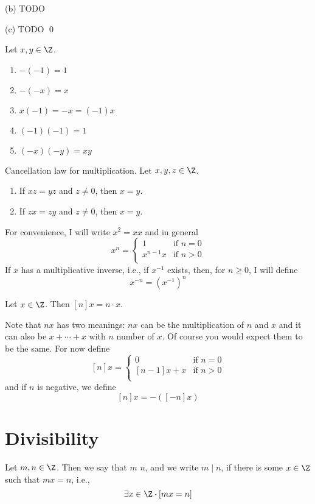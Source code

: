 (b) TODO

(c) TODO
\qed

\begin{prop}
  Let $x, y \in \Z$.
  \begin{enumerate}[nosep,label=\textnormal{(\alph*)}]
  \item $-(-1) = 1$
  \item $-(-x) = x$
  \item $x(-1) = -x = (-1)x$
  \item $(-1)(-1) = 1$
  \item $(-x)(-y) = xy$
  \end{enumerate}
\end{prop}

\begin{prop}
  Cancellation law for multiplication.
  Let $x, y, z \in \Z$.
  \begin{enumerate}[nosep,label=\textnormal{(\alph*)}]
    \item If $xz = yz$ and $z \neq 0$, then $x = y$.
    \item If $zx = zy$ and $z \neq 0$, then $x = y$.
  \end{enumerate}
\end{prop}

For convenience, I will write $x^2 = xx$ and in general
\[
x^n =
\begin{cases}
  1       &\text{if } n = 0 \\
  x^{n-1}x &\text{if } n > 0 \\
\end{cases}
\]
If $x$ has a multiplicative inverse, i.e., if $x^{-1}$ exists,
then, for $n \geq 0$, I will define
\[
x^{-n} = \left( x^{-1} \right)^n
\]

\begin{prop}
  Let $x \in \Z$.
  Then $[n]x = n \cdot x$.
\end{prop}

Note that $nx$ has two meanings: $nx$ can be the multiplication of $n$
and $x$ and it can also be $x + \cdots + x$ with $n$ number of $x$.
Of course you would expect them to be the same.
For now define
\[
  [n]x =
  \begin{cases}
    0       &\text{if } n = 0 \\
    [n-1]x + x &\text{if } n > 0 \\
  \end{cases}
\]
and if $n$ is negative, we define
\[
[n]x = -([-n]x)
\]

\newpage
\section{Divisibility}
\begin{defn}
  Let $m, n \in \Z$.
  Then we say that $m$  $n$, and we write $m \mid n$, if
  there is some $x \in \Z$ such that $mx = n$, i.e.,
  \[
    \exists x \in \Z \cdot [mx = n]
  \]
\end{defn}



